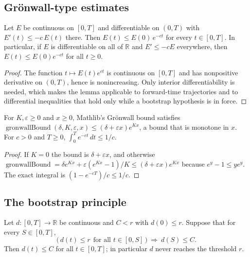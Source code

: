 \subsection{Gr\"onwall-type estimates}

\begin{lemma}\label{lem:ntkf:gronwallDecay}
  \leanok
Let $E$ be continuous on $[0,T]$ and differentiable on $(0,T)$ with $E'(t)\le-c\,E(t)$ there.
Then $E(t)\le E(0)\,e^{-ct}$ for every $t\in[0,T]$. In particular, if $E$ is differentiable on all of
$\mathbb R$ and $E'\le-cE$ everywhere, then $E(t)\le E(0)e^{-ct}$ for all $t\ge0$.
\end{lemma}

\begin{proof}
  \leanok
The function $t\mapsto E(t)e^{ct}$ is continuous on $[0,T]$ and has nonpositive derivative on
$(0,T)$, hence is nonincreasing. Only interior differentiability is needed, which makes the lemma
applicable to forward-time trajectories and to differential inequalities that hold only while a bootstrap
hypothesis is in force.
\end{proof}

\begin{lemma}\label{lem:ntkf:gronwallBound}
  \leanok
For $K,\varepsilon\ge0$ and $x\ge0$, Mathlib's Gr\"onwall bound satisfies
$\operatorname{gronwallBound}(\delta,K,\varepsilon,x)\le(\delta+\varepsilon x)e^{Kx}$, a bound that is
monotone in $x$. For $c>0$ and $T\ge0$, $\int_0^Te^{-ct}\,dt\le1/c$.
\end{lemma}

\begin{proof}
  \leanok
If $K=0$ the bound is $\delta+\varepsilon x$, and otherwise
$\operatorname{gronwallBound}=\delta e^{Kx}+\varepsilon(e^{Kx}-1)/K\le(\delta+\varepsilon x)e^{Kx}$
because $e^{y}-1\le ye^{y}$. The exact integral is $(1-e^{-cT})/c\le1/c$.
\end{proof}

\subsection{The bootstrap principle}

\begin{theorem}\label{thm:ntkf:bootstrap}
  \leanok
Let $d:[0,T]\to\mathbb R$ be continuous and $C<r$ with $d(0)\le r$. Suppose that for every
$S\in[0,T]$,
\[
  \bigl(\,d(t)\le r\ \ \text{for all }t\in[0,S]\,\bigr)\ \Longrightarrow\ d(S)\le C .
\]
Then $d(t)\le C$ for all $t\in[0,T]$; in particular $d$ never reaches the threshold $r$.
\end{theorem}

